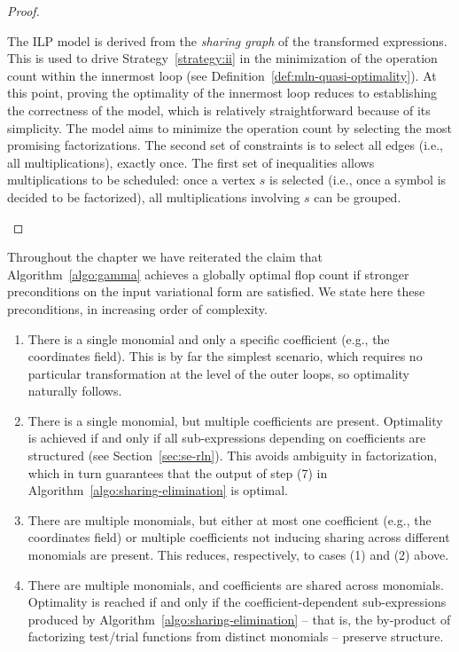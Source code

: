 \begin{proof}
\begin{enumerate}
The ILP model is derived from the {\em sharing graph} of the transformed expressions. This is used to drive Strategy~\ref{strategy:ii} in the minimization of the operation count within the innermost loop (see Definition~\ref{def:mln-quasi-optimality}). At this point, proving the optimality of the innermost loop reduces to establishing the correctness of the model, which is relatively straightforward because of its simplicity. The model aims to minimize the operation count by selecting the most promising factorizations. The second set of constraints is to select all edges (i.e., all multiplications), exactly once. The first set of inequalities allows multiplications to be scheduled: once a vertex $s$ is selected (i.e., once a symbol is decided to be factorized), all multiplications involving $s$ can be grouped. 
\end{enumerate}
\end{proof}


Throughout the chapter we have reiterated the claim that Algorithm~\ref{algo:gamma} achieves a globally optimal flop count if stronger preconditions on the input variational form are satisfied. We state here these preconditions, in increasing order of complexity.
\begin{enumerate}
\item There is a single monomial and only a specific coefficient (e.g., the coordinates field). This is by far the simplest scenario, which requires no particular transformation at the level of the outer loops, so optimality naturally follows.
\item There is a single monomial, but multiple coefficients are present. Optimality is achieved if and only if all sub-expressions depending on coefficients are structured (see Section~\ref{sec:se-rln}). This avoids ambiguity in factorization, which in turn guarantees that the output of step (7) in Algorithm~\ref{algo:sharing-elimination} is optimal.
\item There are multiple monomials, but either at most one coefficient (e.g., the coordinates field) or multiple coefficients not inducing sharing across different monomials are present. This reduces, respectively, to cases (1) and (2) above.
\item There are multiple monomials, and coefficients are shared across monomials. Optimality is reached if and only if the coefficient-dependent sub-expressions produced by Algorithm~\ref{algo:sharing-elimination} -- that is, the by-product of factorizing test/trial functions from distinct monomials -- preserve structure. 
\end{enumerate}


